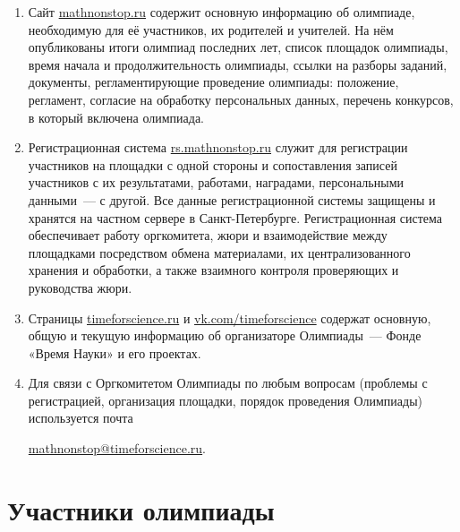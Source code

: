\documentclass[a4paper,12pt]{article}
\newcommand{\surl}[1]{{\small\url{#1}}}
\begin{document}
\begin{enumerate}
	\item Сайт \surl{mathnonstop.ru} содержит основную информацию об олимпиаде, необходимую для её участников, их родителей и учителей. На нём опубликованы итоги олимпиад последних лет, список площадок олимпиады, время начала и продолжительность олимпиады, ссылки на разборы заданий, документы, регламентирующие проведение олимпиады: положение, регламент, согласие на обработку персональных данных, перечень конкурсов, в который включена олимпиада.
	\item Регистрационная система \surl{rs.mathnonstop.ru} служит для регистрации участников на площадки с одной стороны и сопоставления записей участников с их результатами, работами, наградами, персональными данными~— с другой. Все данные регистрационной системы защищены и хранятся на частном сервере в Санкт-Петербурге. Регистрационная система обеспечивает работу оргкомитета, жюри и взаимодействие между площадками посредством обмена материалами, их централизованного хранения и обработки, а также взаимного контроля проверяющих и руководства жюри.
	\item Страницы \surl{timeforscience.ru} и \surl{vk.com/timeforscience} содержат основную, общую и текущую информацию об организаторе Олимпиады~— Фонде «Время Науки» и его проектах.
	\item Для связи с Оргкомитетом Олимпиады по любым вопросам (проблемы с регистрацией, организация площадки, порядок проведения Олимпиады) используется почта \\
	\centerline{\surl{mathnonstop@timeforscience.ru}.}
\end{enumerate}

\section{Участники олимпиады}
\end{document}
